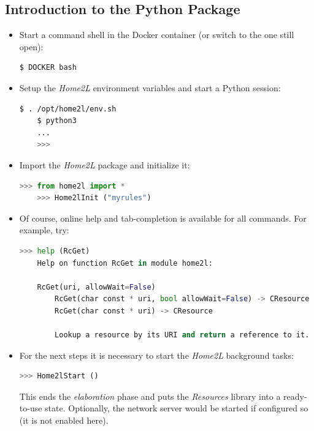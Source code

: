 \documentclass[12pt,english,parskip=half,headheight=19pt]{scrreprt}
\begin{document}
\subsection{Introduction to the Python Package}
\label{sec:tutorial-rules-python}


\begin{itemize}[$\blacktriangleright$]

\item
  Start a command shell in the Docker container (or switch to the one still open):
  \begin{lstlisting}[language=bash]
    $ DOCKER bash
  \end{lstlisting}

\item
  Setup the \textit{Home2L} environment variables and start a Python session:
  \begin{lstlisting}[language=bash]
    $ . /opt/home2l/env.sh
    $ python3
    ...
    >>>
  \end{lstlisting}

\item
  Import the \textit{Home2L} package and initialize it:
  \begin{lstlisting}[language=python]
    >>> from home2l import *
    >>> Home2lInit ("myrules")
  \end{lstlisting}

\item
  Of course, online help and tab-completion is available for all commands. For example, try:
  \begin{lstlisting}[language=python]
    >>> help (RcGet)
    Help on function RcGet in module home2l:

    RcGet(uri, allowWait=False)
        RcGet(char const * uri, bool allowWait=False) -> CResource
        RcGet(char const * uri) -> CResource

        Lookup a resource by its URI and return a reference to it.
  \end{lstlisting}

\item
  For the next steps it is necessary to start the \textit{Home2L} background tasks:
  \begin{lstlisting}[language=python]
    >>> Home2lStart ()
  \end{lstlisting}
  This ends the \textit{elaboration} phase and puts the \textit{Resources} library into a ready-to-use state.
  Optionally, the network server would be started if configured so (it is not enabled here).


\end{itemize}
\end{document}
